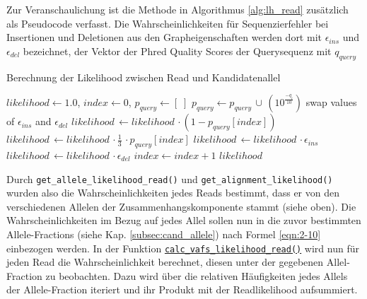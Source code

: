 Zur Veranschaulichung ist die Methode in Algorithmus \ref{alg:lh_read} zusätzlich als Pseudocode verfasst. Die Wahrscheinlichkeiten für Sequenzierfehler bei Insertionen und Deletionen aus den Grapheigenschaften werden dort mit $ \epsilon_{ins} $ und $ \epsilon_{del} $ bezeichnet, der Vektor der Phred Quality Scores der Querysequenz mit $q_{query}$
\newpage
\begin{algorithm}[H]
	\caption{Berechnung der Likelihood zwischen Read und Kandidatenallel}  \label{alg:lh_read}
	\begin{algorithmic}[1]	
		\State $ likelihood \gets 1.0 $, $ index \gets 0 $, $ p_{query} \gets [\;] $
		\State $p_{query} \gets p_{query}\, \cup \, (10^{\frac{-q_{i}}{10}}) $
		\EndFor			
		\State swap values of $ \epsilon_{ins} $ and $ \epsilon_{del} $
		\EndIf
		\State $ likelihood\, \gets likelihood \,\cdotp (1-p_{query}[index]) $
		\EndIf
		\State $ likelihood\, \gets likelihood \,\cdotp \frac{1}{3} \,\cdotp p_{query}[index] $
		\EndIf
		\State $ likelihood\, \gets likelihood \,\cdotp \epsilon_{ins}$
		\EndIf
		\State $ likelihood\, \gets likelihood \,\cdotp \epsilon_{del} $
		\EndIf
		\State $index \gets index + 1 $
		\EndWhile
		\EndFor
		\State \Return $likelihood$
		\EndFunction		
	\end{algorithmic}
\end{algorithm}

Durch \lstinline|get_allele_likelihood_read()| und \lstinline|get_alignment_likelihood()| wurden also die Wahrscheinlichkeiten jedes Reads bestimmt, dass er von den verschiedenen Allelen der Zusammenhangskomponente stammt (siehe oben). Die Wahrscheinlichkeiten im Bezug auf jedes Allel sollen nun in die zuvor bestimmten Allele-Fractions (siehe Kap. \ref{subsec:cand_allele}) nach Formel \eqref{eqn:2-10} einbezogen werden. In der Funktion \hyperref[schritt10]{\lstinline|calc_vafs_likelihood_read()|\label{schritt10txt}} wird nun für jeden Read die Wahrscheinlichkeit berechnet, diesen unter der gegebenen Allel-Fraction zu beobachten. Dazu wird über die relativen Häufigkeiten jedes Allels der Allele-Fraction iteriert und ihr Produkt mit der Readlikelihood aufsummiert. \\

